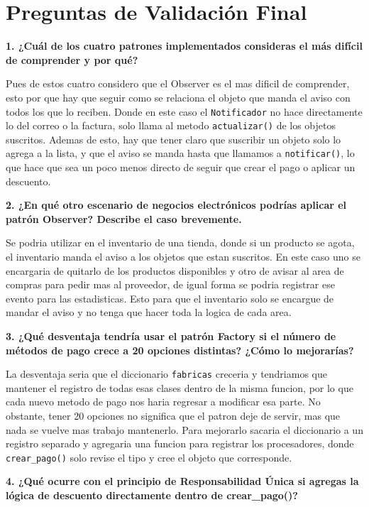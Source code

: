 \documentclass[letterpaper,11pt]{article}
\begin{document}
\section{Preguntas de Validación Final}

\textbf{1. ¿Cuál de los cuatro patrones implementados consideras el más difícil de comprender y por qué?}

Pues de estos cuatro considero que el Observer es el mas dificil de comprender, esto por que hay que seguir como se relaciona el objeto que manda el aviso con todos los que lo reciben. Donde en este caso el \texttt{Notificador} no hace directamente lo del correo o la factura, solo llama al metodo \texttt{actualizar()} de los objetos suscritos. Ademas de esto, hay que tener claro que suscribir un objeto solo lo agrega a la lista, y que el aviso se manda hasta que llamamos a \texttt{notificar()}, lo que hace que sea un poco menos directo de seguir que crear el pago o aplicar un descuento.

\textbf{2. ¿En qué otro escenario de negocios electrónicos podrías aplicar el patrón Observer? Describe el caso brevemente.}

Se podria utilizar en el inventario de una tienda, donde si un producto se agota, el inventario manda el aviso a los objetos que estan suscritos. En este caso uno se encargaria de quitarlo de los productos disponibles y otro de avisar al area de compras para pedir mas al proveedor, de igual forma se podria registrar ese evento para las estadisticas. Esto para que el inventario solo se encargue de mandar el aviso y no tenga que hacer toda la logica de cada area.

\textbf{3. ¿Qué desventaja tendría usar el patrón Factory si el número de métodos de pago crece a 20 opciones distintas? ¿Cómo lo mejorarías?}

La desventaja seria que el diccionario \texttt{fabricas} creceria y tendriamos que mantener el registro de todas esas clases dentro de la misma funcion, por lo que cada nuevo metodo de pago nos haria regresar a modificar esa parte. No obstante, tener 20 opciones no significa que el patron deje de servir, mas que nada se vuelve mas trabajo mantenerlo. Para mejorarlo sacaria el diccionario a un registro separado y agregaria una funcion para registrar los procesadores, donde \texttt{crear\_pago()} solo revise el tipo y cree el objeto que corresponde.

\textbf{4. ¿Qué ocurre con el principio de Responsabilidad Única si agregas la lógica de descuento directamente dentro de crear\_pago()?}
\end{document}
